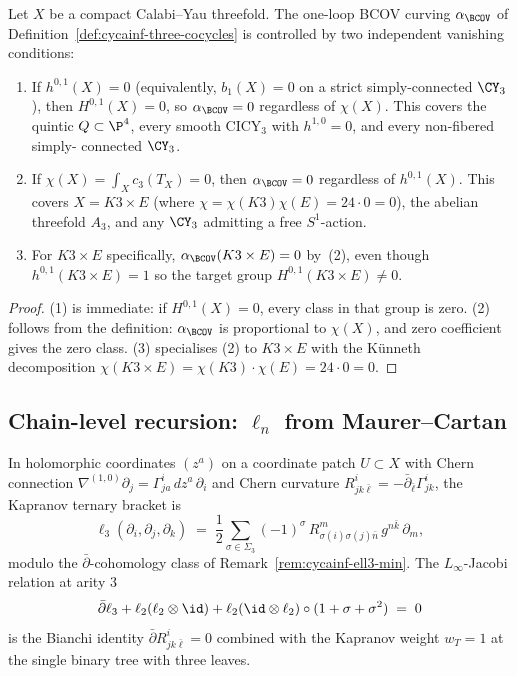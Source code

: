 \begin{proposition}
\label{prop:cycainf-alphabcov-scope}
Let $X$ be a compact Calabi--Yau threefold. The one-loop BCOV curving
$\alpha_{\BCOV}$ of Definition~\ref{def:cycainf-three-cocycles} is
controlled by two independent vanishing conditions:
\begin{enumerate}
\item If $h^{0,1}(X) = 0$ (equivalently, $b_1(X) = 0$ on a strict
simply-connected $\CY_3$), then $H^{0,1}(X) = 0$, so $\alpha_{\BCOV}
= 0$ regardless of $\chi(X)$. This covers the quintic $Q \subset \P^4$,
every smooth CICY$_3$ with $h^{1,0} = 0$, and every non-fibered simply-
connected $\CY_3$.
\item If $\chi(X) = \int_X c_3(T_X) = 0$, then $\alpha_{\BCOV} = 0$
regardless of $h^{0,1}(X)$. This covers $X = K3 \times E$ (where
$\chi = \chi(K3) \chi(E) = 24 \cdot 0 = 0$), the abelian threefold
$A_3$, and any $\CY_3$ admitting a free $S^1$-action.
\item For $K3 \times E$ specifically, $\alpha_{\BCOV}(K3 \times E) = 0$
by~(2), even though $h^{0,1}(K3 \times E) = 1$ so the target group
$H^{0,1}(K3 \times E) \neq 0$.
\end{enumerate}
\end{proposition}

\begin{proof}
(1) is immediate: if $H^{0,1}(X) = 0$, every class in that group is
zero. (2) follows from the definition: $\alpha_{\BCOV}$ is proportional
to $\chi(X)$, and zero coefficient gives the zero class. (3) specialises
(2) to $K3 \times E$ with the K\"unneth decomposition $\chi(K3 \times
E) = \chi(K3) \cdot \chi(E) = 24 \cdot 0 = 0$.
\end{proof}

\subsection{Chain-level recursion: \texorpdfstring{$\ell_n$}{ell-n} from Maurer--Cartan}
\label{subsec:cycainf-ell-n-mc-recursion}

\begin{proposition}
\label{prop:cycainf-ell3-christoffel}
In holomorphic coordinates $(z^a)$ on a coordinate patch $U \subset X$
with Chern connection $\nabla^{(1,0)} \partial_j = \Gamma^i_{j a}
\, dz^a \, \partial_i$ and Chern curvature $R^i_{j k \bar \ell} =
-\bar\partial_{\bar \ell} \Gamma^i_{j k}$, the Kapranov ternary bracket is
\[
 \ell_3(\partial_i, \partial_j, \partial_k)
 \;=\;
 \frac{1}{2} \sum_{\sigma \in \Sigma_3} (-1)^\sigma\,
 R^m_{\sigma(i) \sigma(j) \bar n}\,
 g^{n \bar k}\, \partial_m,
\]
modulo the $\bar\partial$-cohomology class of
Remark~\ref{rem:cycainf-ell3-min}. The $L_\infty$-Jacobi relation at
arity $3$
\[
 \bar\partial \ell_3 + \ell_2(\ell_2 \otimes \id) + \ell_2(\id
 \otimes \ell_2) \circ (1 + \sigma + \sigma^2) \;=\; 0
\]
is the Bianchi identity $\bar\partial R^i_{j k \bar \ell} = 0$ combined
with the Kapranov weight $w_T = 1$ at the single binary tree with three
leaves.
\end{proposition}


